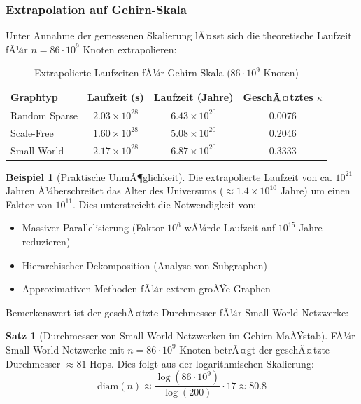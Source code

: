 ﻿\documentclass[a4paper,12pt]{article}
\theoremstyle{definition}
\newtheorem{beispiel}{Beispiel}
\newtheorem{satz}{Satz}
\begin{document}
	\subsubsection{Extrapolation auf Gehirn-Skala}
	
	Unter Annahme der gemessenen Skalierung lÃ¤sst sich die theoretische Laufzeit fÃ¼r $n = 86 \cdot 10^9$ Knoten extrapolieren:
	
	\begin{table}[H]
		\centering
		\caption{Extrapolierte Laufzeiten fÃ¼r Gehirn-Skala ($86 \cdot 10^9$ Knoten)}
		\label{tab:brain_scale_extrapolation}
		\begin{tabular}{lccc}
			\hline
			\textbf{Graphtyp} & \textbf{Laufzeit (s)} & \textbf{Laufzeit (Jahre)} & \textbf{GeschÃ¤tztes $\kappa$} \\
			\hline
			Random Sparse & $2.03 \times 10^{28}$ & $6.43 \times 10^{20}$ & 0.0076 \\
			Scale-Free & $1.60 \times 10^{28}$ & $5.08 \times 10^{20}$ & 0.2046 \\
			Small-World & $2.17 \times 10^{28}$ & $6.87 \times 10^{20}$ & 0.3333 \\
			\hline
		\end{tabular}
	\end{table}
	
	\begin{beispiel}[Praktische UnmÃ¶glichkeit]
		Die extrapolierte Laufzeit von ca. $10^{21}$ Jahren Ã¼berschreitet das Alter des Universums ($\approx 1.4 \times 10^{10}$ Jahre) um einen Faktor von $10^{11}$. Dies unterstreicht die Notwendigkeit von:
		\begin{itemize}
			\item[-] Massiver Parallelisierung (Faktor $10^6$ wÃ¼rde Laufzeit auf $10^{15}$ Jahre reduzieren)
			\item[-] Hierarchischer Dekomposition (Analyse von Subgraphen)
			\item[-] Approximativen Methoden fÃ¼r extrem groÃŸe Graphen
		\end{itemize}
	\end{beispiel}
	
	Bemerkenswert ist der geschÃ¤tzte Durchmesser fÃ¼r Small-World-Netzwerke:
	
	\begin{satz}[Durchmesser von Small-World-Netzwerken im Gehirn-MaÃŸstab]
		FÃ¼r Small-World-Netzwerke mit $n = 86 \cdot 10^9$ Knoten betrÃ¤gt der geschÃ¤tzte Durchmesser $\approx 81$ Hops. Dies folgt aus der logarithmischen Skalierung:
		\[
		\text{diam}(n) \approx \frac{\log(86 \cdot 10^9)}{\log(200)} \cdot 17 \approx 80.8
		\]
	\end{satz}
	
\end{document}
